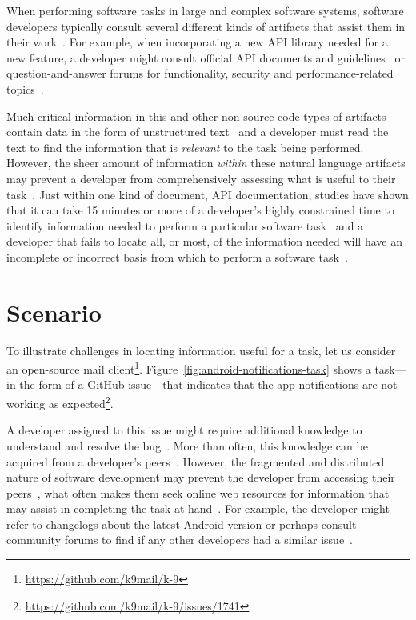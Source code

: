 

When performing software tasks in large and complex software systems, software developers typically consult several different kinds of artifacts that assist them in their work~\cite{Starke2009, Meyer2017}. For example, 
when incorporating a new API library needed for a new feature, a developer might consult official API documents and guidelines~\cite{robillard2011field, umarji2008archetypal} or 
 question-and-answer forums for functionality, security and performance-related topics~\cite{parnin2012, silva2019}.



Much critical information in this and other non-source code types of artifacts 
contain data in the form of unstructured text~\cite{Bavota2016} and 
a developer must read the text to find the information that is \textit{relevant} to the task being performed.
However, the sheer amount of information \textit{within} these natural language artifacts may prevent a developer from comprehensively assessing what is useful to their task~\cite{Murphy2005}. Just within one kind of document, API
documentation, studies have shown that it can take 15 minutes or more
of a developer's highly constrained time to identify 
information needed to perform a particular software task~\cite{endrikat2014, Meyer2017}
and a developer that fails to locate all, or most, of the information needed
 will have an incomplete or incorrect basis from which to perform a software task~\cite{Murphy2005}.





\section{Scenario}
\label{cp1:example}




To illustrate challenges in locating information useful for a task, let us consider an open-source mail client\footnote{\url{https://github.com/k9mail/k-9}}.
Figure~\ref{fig:android-notifications-task} shows a task---in the form of a GitHub issue---that indicates that the app notifications 
are not working as expected\footnote{\url{https://github.com/k9mail/k-9/issues/1741}}. 


A developer assigned to this issue might require additional knowledge to understand and resolve the bug~\cite{ko2007, Li2013, sillito2006}. 
More than often, this knowledge can be acquired from a developer's peers~\cite{singer2011}. 
However, the fragmented and distributed nature of software development  
may prevent the developer from accessing their peers~\cite{ko2007},
what often makes  them seek online web resources for information 
that may assist in completing the task-at-hand~\cite{Xia2017, rao2020}.
For example, the developer might refer to changelogs 
about the latest Android version or perhaps
consult community forums to find if any other developers had a similar issue~\cite{parnin2012}. 


